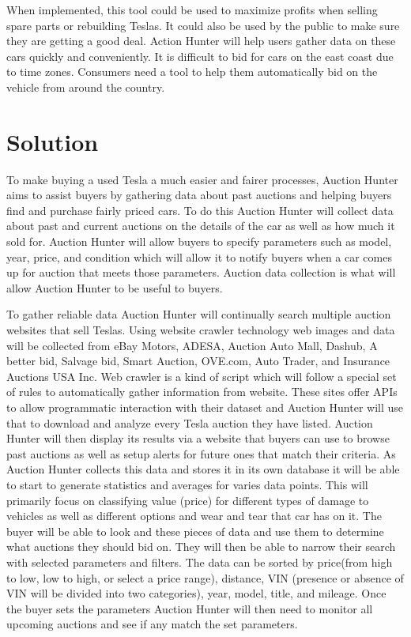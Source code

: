 \documentclass[draftclsnofoot,onecolumn,10pt]{IEEEtran}
\begin{document}
\vspace{3mm}When implemented, this tool could be used to maximize profits when selling spare parts or rebuilding Teslas. It could also be used by the public to make sure they are getting a good deal. Action Hunter will help users gather data on these cars quickly and conveniently. It is difficult to bid for cars on the east coast due to time zones. Consumers need a tool to help them automatically bid on the vehicle from around the country. 


\section{Solution}
To make buying a used Tesla a much easier and fairer processes, Auction Hunter aims to assist buyers by
gathering data about past auctions and helping buyers find and purchase fairly priced cars. To do this Auction Hunter will collect data about past and current auctions on the details of the car as well as how much it sold for. Auction Hunter will allow buyers to specify parameters such as model, year, price, and condition which will allow it to notify buyers when a car comes up for auction that meets those parameters. Auction data collection is what will allow Auction Hunter to be useful to buyers.

\vspace{3mm}To gather reliable data Auction Hunter will continually search multiple auction websites that sell Teslas. Using website crawler technology web images and data will be collected from eBay Motors, ADESA, Auction Auto Mall, Dashub, A better bid, Salvage bid, Smart Auction, OVE.com, Auto Trader, and Insurance Auctions USA Inc. Web crawler is a kind of script which will follow a special set of rules to automatically gather information from website. These sites offer APIs to allow programmatic interaction with their dataset and Auction Hunter will use that to download and analyze every Tesla auction they have listed. Auction Hunter will then display its results via a website that buyers can use to browse past auctions as well as setup alerts for future ones that match their criteria. As Auction Hunter collects this data and stores it in its own database it will be able to start to generate statistics and averages for varies data points. This will primarily focus on classifying value (price) for different types of damage to vehicles as well as different options and wear and tear that car has on it. The buyer will be able to look and these pieces of data and use them to determine what auctions they should bid on. They will then be able to narrow their search with selected parameters and filters. The data can be sorted by price(from high to low, low to high, or select a price range), distance, VIN (presence or absence of VIN will be divided into two categories), year, model, title, and mileage. Once the buyer sets the parameters Auction Hunter will then need to monitor all upcoming auctions and see if any match the set parameters. 
\end{document}
